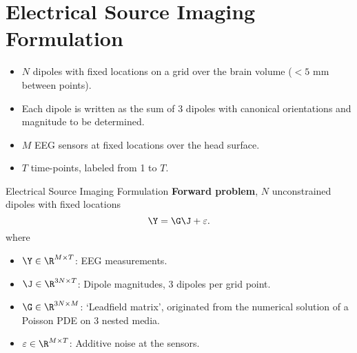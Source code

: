 \section{Electrical Source Imaging Formulation}
\begin{itemize}
    \item $N$ dipoles with fixed locations on a grid over the brain volume ($<5$ mm between points).
    \item Each dipole is written as the sum of 3 dipoles with canonical orientations and magnitude to be determined.
    \item $M$ EEG sensors at fixed locations over the head surface.
    \item $T$ time-points, labeled from 1 to $T$.
\end{itemize}
 

 {Electrical Source Imaging Formulation}
\textbf{Forward problem}, $N$ unconstrained dipoles with fixed locations
\begin{equation}
\Y = \G \J + \varepsilon.
\end{equation}
where
\begin{itemize}
\item $\Y \in \R^{M \times T}$: EEG measurements.
\item $\J \in \R^{3N \times T}$: Dipole magnitudes, 3 dipoles per grid point.
\item $\G \in \R^{3N\times M}$: `Leadfield matrix', originated from the numerical solution of a Poisson PDE on 3 nested media.
\item $\varepsilon\in \R^{M\times T}$: Additive noise at the sensors.
\end{itemize}
 

%
% 

